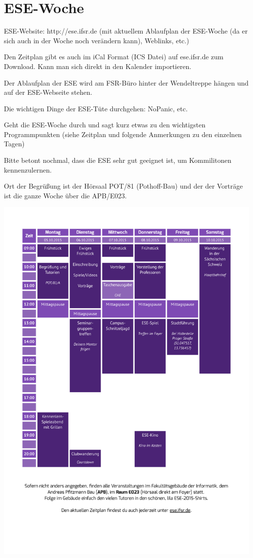 \documentclass[a4paper,12pt]{report}
\begin{document}
\section{ESE-Woche}
\begin{itemize*}
\item ESE-Website: http://ese.ifsr.de (mit aktuellem Ablaufplan der ESE-Woche (da er sich auch in der Woche noch verändern kann), Weblinks, etc.)
\item Den Zeitplan gibt es auch im iCal Format (ICS Datei) auf ese.ifsr.de zum Download.
Kann man sich direkt in den Kalender importieren.
\item Der Ablaufplan der ESE wird am FSR-Büro hinter der Wendeltreppe hängen und auf der ESE-Webseite stehen.
\item Die wichtigen Dinge der ESE-Tüte durchgehen: NoPanic, etc.
\item Geht die ESE-Woche durch und sagt kurz etwas zu den wichtigsten Programmpunkten (siehe Zeitplan und folgende Anmerkungen zu den einzelnen Tagen)
\item Bitte betont nochmal, dass die ESE sehr gut geeignet ist, um Kommilitonen kennenzulernen.
\end{itemize*}
\vspace{0.5cm}
Ort der Begrüßung ist der Hörsaal POT/81 (Pothoff-Bau) und der der Vorträge ist die ganze Woche über die APB/E023.

\includegraphics[width=\linewidth]{./zeitplan_2015.pdf}
\end{document}
